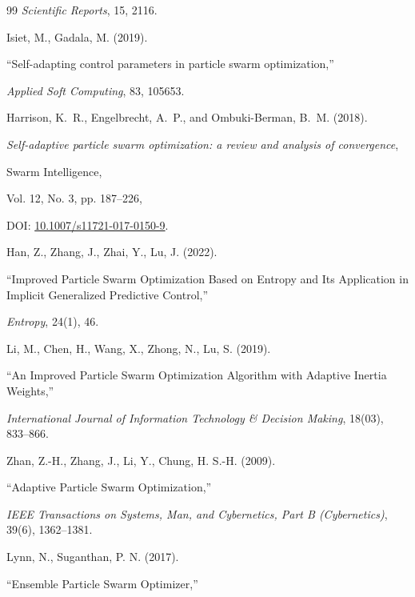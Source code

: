 \documentclass[fleqn,10pt]{wlscirep}
\begin{document}
\begin{thebibliography}{99}
\textit{Scientific Reports}, 15, 2116.




Isiet, M., Gadala, M. (2019).

``Self-adapting control parameters in particle swarm optimization,''

\textit{Applied Soft Computing}, 83, 105653.




Harrison, K.~R., Engelbrecht, A.~P., and Ombuki-Berman, B.~M. (2018).

\emph{Self-adaptive particle swarm optimization: a review and analysis of convergence},

Swarm Intelligence,

Vol. 12, No. 3, pp. 187--226,

DOI: \href{https://doi.org/10.1007/s11721-017-0150-9}{10.1007/s11721-017-0150-9}.




Han, Z., Zhang, J., Zhai, Y., Lu, J. (2022).

``Improved Particle Swarm Optimization Based on Entropy and Its Application in Implicit Generalized Predictive Control,''

\textit{Entropy}, 24(1), 46.




Li, M., Chen, H., Wang, X., Zhong, N., Lu, S. (2019).

``An Improved Particle Swarm Optimization Algorithm with Adaptive Inertia Weights,''

\textit{International Journal of Information Technology \& Decision Making}, 18(03), 833--866.




Zhan, Z.-H., Zhang, J., Li, Y., Chung, H. S.-H. (2009).

``Adaptive Particle Swarm Optimization,''

\textit{IEEE Transactions on Systems, Man, and Cybernetics, Part B (Cybernetics)}, 39(6), 1362--1381.




Lynn, N., Suganthan, P. N. (2017).

``Ensemble Particle Swarm Optimizer,''


\end{thebibliography}
\end{document}
